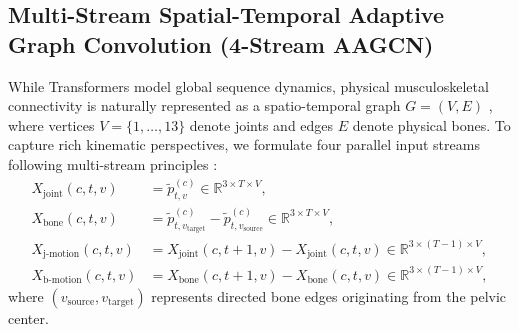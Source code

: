 \documentclass[runningheads]{llncs}
\begin{document}
\subsection{Multi-Stream Spatial-Temporal Adaptive Graph Convolution (4-Stream AAGCN)}
While Transformers model global sequence dynamics, physical musculoskeletal connectivity is naturally represented as a spatio-temporal graph $G = (V, E)$ \cite{yan2018}, where vertices $V = \{1, \dots, 13\}$ denote joints and edges $E$ denote physical bones. To capture rich kinematic perspectives, we formulate four parallel input streams following multi-stream principles \cite{shi2019two,shi2020skeleton}:
\begin{align}
    X_{\text{joint}}(c, t, v) &= \tilde{p}_{t, v}^{(c)} \in \mathbb{R}^{3 \times T \times V}, \\
    X_{\text{bone}}(c, t, v) &= \tilde{p}_{t, v_{\text{target}}}^{(c)} - \tilde{p}_{t, v_{\text{source}}}^{(c)} \in \mathbb{R}^{3 \times T \times V}, \\
    X_{\text{j-motion}}(c, t, v) &= X_{\text{joint}}(c, t+1, v) - X_{\text{joint}}(c, t, v) \in \mathbb{R}^{3 \times (T-1) \times V}, \\
    X_{\text{b-motion}}(c, t, v) &= X_{\text{bone}}(c, t+1, v) - X_{\text{bone}}(c, t, v) \in \mathbb{R}^{3 \times (T-1) \times V},
\end{align}
where $(v_{\text{source}}, v_{\text{target}})$ represents directed bone edges originating from the pelvic center.
\end{document}
